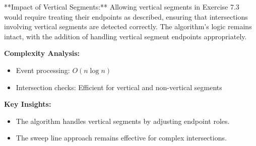 **Impact of Vertical Segments:** Allowing vertical segments in Exercise 7.3 would require treating their endpoints as described, ensuring that intersections involving vertical segments are detected correctly. The algorithm's logic remains intact, with the addition of handling vertical segment endpoints appropriately.

\textbf{Complexity Analysis:}
\begin{itemize}[noitemsep]
    \item Event processing: $O(n \log n)$
    \item Intersection checks: Efficient for vertical and non-vertical segments
\end{itemize}

\textbf{Key Insights:}
\begin{itemize}[noitemsep]
    \item The algorithm handles vertical segments by adjusting endpoint roles.
    \item The sweep line approach remains effective for complex intersections.
\end{itemize}
